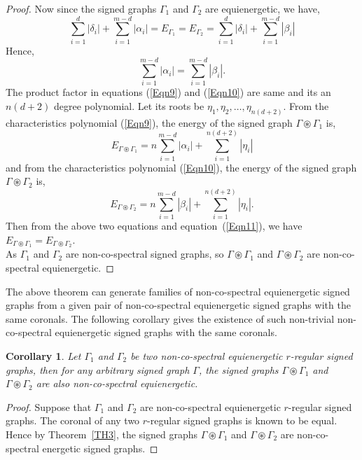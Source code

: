 \documentclass[12pt,a4paper]{article}
\newtheorem{corollary}{Corollary}[theorem]
\theoremstyle{definition}
\theoremstyle{remark}
\begin{document}
\begin{proof}
        Now since the signed graphs $\Gamma_1$ and $\Gamma_2$ are equienergetic, we have,
        \begin{equation*}
            \sum_{i=1}^d|\delta_i|+\sum_{i=1}^{m-d}|\alpha_i|=E_{\Gamma_1}=E_{\Gamma_2}=\sum_{i=1}^d|\delta_i|+\sum_{i=1}^{m-d}|\beta_i|
        \end{equation*}
        Hence,\begin{equation}\label{Eqn11}
            \sum_{i=1}^{m-d}|\alpha_i|=\sum_{i=1}^{m-d}|\beta_i|.
        \end{equation}
        The product factor in equations (\ref{Eqn9}) and (\ref{Eqn10}) are same and its an $n(d+2)$ degree polynomial. Let its roots be $\eta_1,\eta_2,\ldots,\eta_{n(d+2)}$. From the characteristics polynomial (\ref{Eqn9}), the energy of the signed graph $\Gamma\circledast\Gamma_1$ is, \begin{equation}\label{Eqn12}
                E_{\Gamma\circledast\Gamma_1}=n\sum_{i=1}^{m-d}|\alpha_i|+\sum_{i=1}^{n(d+2)}|\eta_i|
        \end{equation}
        and from the characteristics polynomial (\ref{Eqn10}), the energy of the signed graph $\Gamma\circledast\Gamma_2$ is,
        \begin{equation}\label{Eqn13}
            E_{\Gamma\circledast\Gamma_2}=n\sum_{i=1}^{m-d}|\beta_i|+\sum_{i=1}^{n(d+2)}|\eta_i|.
        \end{equation}
        Then from the above two equations and equation~(\ref{Eqn11}), we have $E_{\Gamma\circledast\Gamma_1}=E_{\Gamma\circledast\Gamma_2}$.\\
        As $\Gamma_1$ and $\Gamma_2$ are non-co-spectral signed graphs, so $\Gamma\circledast\Gamma_1$ and $\Gamma\circledast\Gamma_2$ are non-co-spectral equienergetic.
   \end{proof}
   The above theorem can generate families of non-co-spectral equienergetic signed graphs from a given pair of non-co-spectral equienergetic signed graphs with the same coronals. The following corollary gives the existence of such non-trivial non-co-spectral equienergetic signed graphs with the same coronals.

    \begin{corollary}
        Let $\Gamma_1$ and $\Gamma_2$ be two non-co-spectral equienergetic $r$-regular signed graphs, then for any arbitrary signed graph $\Gamma$, the signed graphs $\Gamma\circledast\Gamma_1$ and $\Gamma\circledast\Gamma_2$ are also non-co-spectral equienergetic.
    \end{corollary}
    \begin{proof}
        Suppose that $\Gamma_1$ and $\Gamma_2$ are non-co-spectral equienergetic $r$-regular signed graphs. The coronal of any two $r$-regular signed graphs is known to be equal. Hence by Theorem~\ref{TH3}, the signed graphs $\Gamma\circledast\Gamma_1$ and $\Gamma\circledast\Gamma_2$ are non-co-spectral energetic signed graphs.
    \end{proof}
\end{document}
